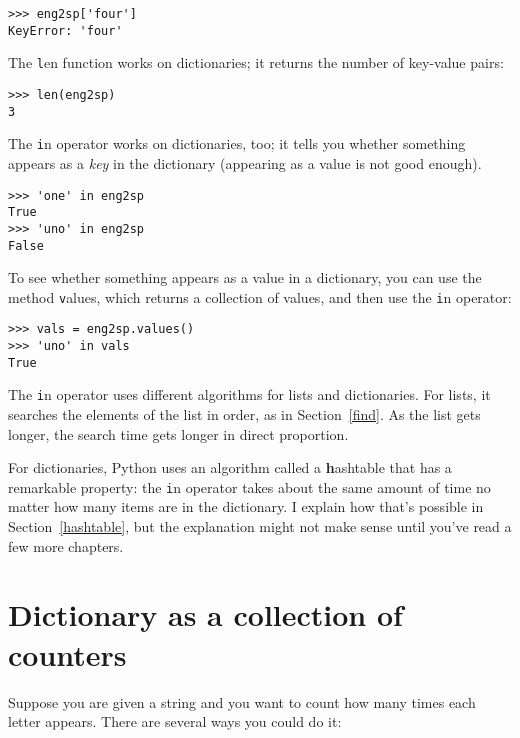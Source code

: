 \documentclass[
DIV=11,
fontsize=12,
twoside,
headinclude=false,
titlepage=firstiscover,
abstract=true,
headsepline=true,
footsepline=true,
chapterprefix=true, %
headings=big,
bibliography=totoc,%
captions=tableheading
]{scrbook}
\theoremstyle{definition}
\begin{document}
\begin{lstlisting}
>>> eng2sp['four']
KeyError: 'four'
\end{lstlisting}
%
The {\texttt len} function works on dictionaries; it returns the
number of key-value pairs:

\begin{lstlisting}
>>> len(eng2sp)
3
\end{lstlisting}
%
The {\texttt in} operator works on dictionaries, too; it tells you whether
something appears as a {\em key} in the dictionary (appearing
as a value is not good enough).

\begin{lstlisting}
>>> 'one' in eng2sp
True
>>> 'uno' in eng2sp
False
\end{lstlisting}
%
To see whether something appears as a value in a dictionary, you
can use the method {\texttt values}, which returns a collection of
values, and then use the {\texttt in} operator:

\begin{lstlisting}
>>> vals = eng2sp.values()
>>> 'uno' in vals
True
\end{lstlisting}
%
The {\texttt in} operator uses different algorithms for lists and
dictionaries.  For lists, it searches the elements of the list in
order, as in Section~\ref{find}.  As the list gets longer, the search
time gets longer in direct proportion.

For dictionaries, Python uses an
algorithm called a {\textbf hashtable} that has a remarkable property: the
{\texttt in} operator takes about the same amount of time no matter how
many items are in the dictionary.  I explain how that's possible
in Section~\ref{hashtable}, but the explanation might not make
sense until you've read a few more chapters.


\section{Dictionary as a collection of counters}
\label{histogram}

Suppose you are given a string and you want to count how many
times each letter appears.  There are several ways you could do it:
\end{document}
